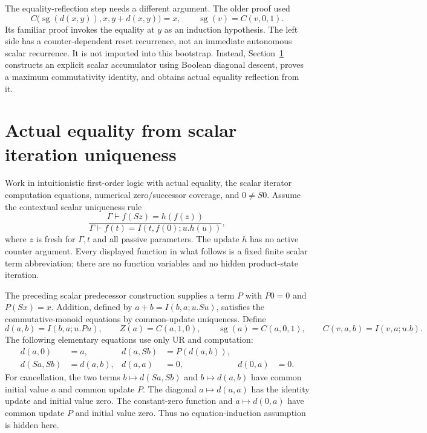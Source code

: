 \documentclass[11pt]{article}
\theoremstyle{definition}\newtheorem{definition}[theorem]{Definition}
\begin{document}
The equality-reflection step needs a different argument.  The older
proof used
\[
 C\bigl(\operatorname{sg}(d(x,y)),x,y+d(x,y)\bigr)=x,
 \qquad \operatorname{sg}(v)=C(v,0,1).
\]
Its familiar proof invokes the equality at $y$ as an induction hypothesis.
The left side has a counter-dependent reset recurrence, not an immediate
autonomous scalar recurrence.  It is not imported into this bootstrap.
Instead, Section~\ref{sec:ur-reflection-completion} constructs an explicit
scalar accumulator using Boolean diagonal descent, proves a maximum
commutativity identity, and obtains actual equality reflection from it.


\section{Actual equality from scalar iteration uniqueness}
\label{sec:ur-reflection-completion}

Work in intuitionistic first-order logic with actual equality, the scalar
iterator computation equations, numerical zero/successor coverage, and
$0\ne S0$. Assume the contextual scalar uniqueness rule
\[
 \frac{\Gamma\vdash f(Sz)=h(f(z))}
      {\Gamma\vdash f(t)=I(t,f(0);u.h(u))},
 \tag{UR}
\]
where $z$ is fresh for $\Gamma,t$ and all passive parameters. The update
$h$ has no active counter argument. Every displayed function in what
follows is a fixed finite scalar term abbreviation; there are no function
variables and no hidden product-state iteration.

The preceding scalar predecessor construction supplies a term $P$ with
$P0=0$ and $P(Sx)=x$. Addition, defined by
$a+b=I(b,a;u.Su)$, satisfies the commutative-monoid equations by common-update
uniqueness. Define
\[
 d(a,b)=I(b,a;u.Pu),\qquad
 Z(a)=C(a,1,0),\qquad \operatorname{sg}(a)=C(a,0,1),
 \qquad C(v,a,b)=I(v,a;u.b).
\]
The following elementary equations use only UR and computation:
\begin{equation}
\begin{aligned}
 d(a,0)&=a,&d(a,Sb)&=P(d(a,b)),\\
 d(Sa,Sb)&=d(a,b),&d(a,a)&=0,&d(0,a)&=0.
\end{aligned}
 \label{eq:ur-monus-basics}
\end{equation}
For cancellation, the two terms $b\mapsto d(Sa,Sb)$ and $b\mapsto d(a,b)$
have common initial value $a$ and common update $P$. The diagonal
$a\mapsto d(a,a)$ has the identity update and initial value zero. The
constant-zero function and $a\mapsto d(0,a)$ have common update $P$ and
initial value zero. Thus no equation-induction assumption is hidden here.
\end{document}

